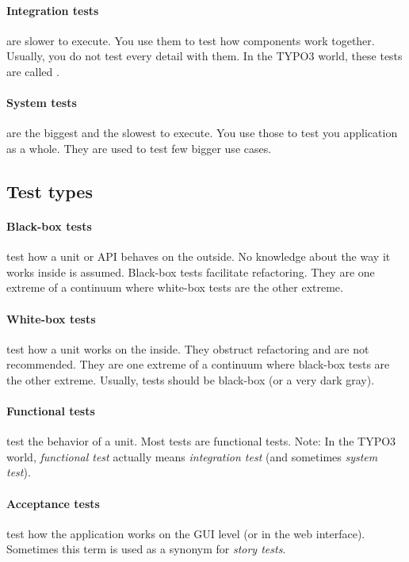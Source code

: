 \documentclass[a4paper,11pt,headsepline]{scrartcl}
\begin{document}
\paragraph{Integration tests} are slower to execute. You use them to test how components work together. Usually, you do not test every detail with them. In the TYPO3 world, these tests are called .

\paragraph{System tests} are the biggest and the slowest to execute. You use those to test you application as a whole. They are used to test few bigger use cases.


\subsection{Test types}

\paragraph{Black-box tests} test how a unit or API behaves on the outside. No knowledge about the way it works inside is assumed. Black-box tests facilitate refactoring. They are one extreme of a continuum where white-box tests are the other extreme.

\paragraph{White-box tests} test how a unit works on the inside. They obstruct refactoring and are not recommended. They are one extreme of a continuum where black-box tests are the other extreme. Usually, tests should be black-box (or a very dark gray).

\paragraph{Functional tests} test the behavior of a unit. Most tests are functional tests. Note: In the TYPO3 world, \emph{functional test} actually means \emph{integration test} (and sometimes \emph{system test}).

\paragraph{Acceptance tests} test how the application works on the GUI level (or in the web interface). Sometimes this term is used as a synonym for \emph{story tests}.
\end{document}
